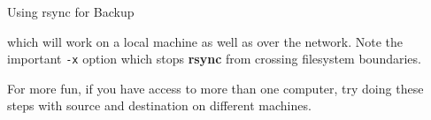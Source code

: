 \begin{Lab}
\begin{exe} {Using rsync for Backup}
\begin{enumerate}
         which will work on a local machine as well as over
         the network.  Note the important \verb?-x? option
         which stops \textbf{rsync} from crossing
         filesystem boundaries.
      \end{enumerate}
      \begin{lfbox}
         For more fun, if you have access to more than one computer,
         try doing these steps with source and destination on different
         machines.
      \end{lfbox}
   \end{exe}

\end{Lab}
